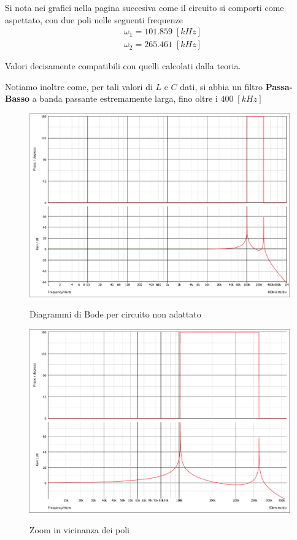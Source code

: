 \documentclass[a4paper,12pt]{report}
\begin{document}
Si nota nei grafici nella pagina succesiva come il circuito si comporti come aspettato, con due poli nelle seguenti frequenze
\begin{align}
&\omega_1 = 101.859 \; [kHz]\\
&\omega_2 = 265.461 \; [kHz]
\end{align}

Valori decisamente compatibili con quelli calcolati dalla teoria.

Notiamo inoltre come, per tali valori di $L$ e $C$ dati, si abbia un filtro \textbf{Passa-Basso} a banda passante estremamente larga, fino oltre i $400 \; [kHz]$

\begin{figure}[!htb]
	\centering
	\includegraphics[width=.8\textwidth]{pictures/LCLC_non_adattato.pdf}
	\label{fig:largenenough}
	\caption{\label{lul} \small Diagrammi di Bode per circuito non adattato}
\end{figure}

\begin{figure}[!htb]
	\centering
	\includegraphics[width=.8\textwidth]{pictures/LCLC_non_adattato_zoom_osc.pdf}
	\label{fig:largenenough}
	\caption{\label{lul} \small Zoom in vicinanza dei poli}
\end{figure}
\end{document}
